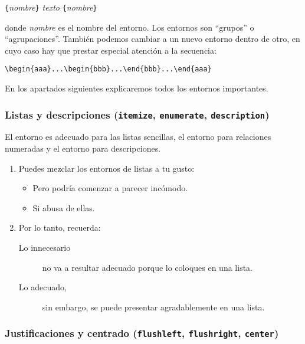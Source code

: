 \begin{command}
\verb|{|\emph{nombre}\verb|}|\quad
   \emph{texto}\quad
{}\verb|{|\emph{nombre}\verb|}|
\end{command}

\noindent donde \emph{nombre}  es el nombre del  entorno. Los entornos
son ``grupos'' o ``agrupaciones''. También  podemos cambiar a un nuevo
entorno dentro de otro, en cuyo caso hay que prestar especial atención
a la secuencia:

\begin{code}
\verb|\begin{aaa}...\begin{bbb}...\end{bbb}...\end{aaa}|
\end{code}

En   los  apartados   siguientes  explicaremos   todos  los   entornos
importantes.

\subsubsection{Listas y descripciones (\texttt{itemize},
  \texttt{enumerate}, \texttt{description})}

El  entorno    es  adecuado  para  las  listas  sencillas,
el  entorno   para  relaciones  numeradas  y el  entorno
 para descripciones.

\begin{example}
\begin{enumerate}
\item Puedes mezclar los entornos
de listas a tu gusto:
\begin{itemize}
\item Pero podría comenzar a
parecer incómodo.
\item Si abusa de ellas.
\end{itemize}
\item Por lo tanto, recuerda:
\begin{description}
\item[Lo innecesario] no va a
resultar adecuado porque
lo coloques en una lista.
\item[Lo adecuado,] sin embargo,
se puede presentar agradablemente
en una lista.
\end{description}
\end{enumerate}
\end{example}
 
\subsubsection{Justificaciones y centrado (\texttt{flushleft},
            \texttt{flushright}, \texttt{center})}

